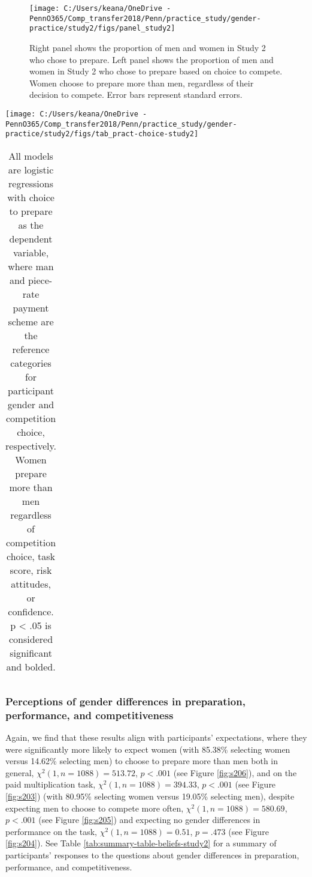 \documentclass[letterpaper, nobind]{templates/ociamthesis}
\begin{document}
\begin{figure}

{\centering \texttt{[image: C:/Users/keana/OneDrive - PennO365/Comp\_transfer2018/Penn/practice\_study/gender-practice/study2/figs/panel\_study2]} 

}

\caption{Right panel shows the proportion of men and women in Study 2 who chose to prepare. Left panel shows the proportion of men and women in Study 2 who chose to prepare based on choice to compete. Women choose to prepare more than men, regardless of their decision to compete. Error bars represent standard errors.}\label{fig:panel-study2}
\end{figure}
\newpage

\begin{center}\texttt{[image: C:/Users/keana/OneDrive - PennO365/Comp\_transfer2018/Penn/practice\_study/gender-practice/study2/figs/tab\_pract-choice-study2]} \end{center}

\begin{table}[ht]
\centering
\begingroup\fontsize{0.1pt}{0.1pt}\selectfont
\begin{tabular}{r}
   \\ 
 \end{tabular}
\endgroup
\caption{All models are logistic regressions with choice to prepare as the dependent variable, where man and piece-rate payment scheme are the reference categories for participant gender and competition choice, respectively. Women prepare more than men regardless of competition choice, task score, risk attitudes, or confidence. p < .05 is considered significant and bolded.} 
\label{tab:tab-pract-choice-study2}
\end{table}

\hypertarget{perceptions-of-gender-differences-in-preparation-performance-and-competitiveness-2}{%
\subsubsection{Perceptions of gender differences in preparation, performance, and competitiveness}\label{perceptions-of-gender-differences-in-preparation-performance-and-competitiveness-2}}

Again, we find that these results align with participants' expectations, where they were significantly more likely to expect women (with 85.38\% selecting women versus 14.62\% selecting men) to choose to prepare more than men both in general, \(\chi^2(1, n = 1088) = 513.72\), \(p < .001\) (see Figure \ref{fig:s206}), and on the paid multiplication task, \(\chi^2(1, n = 1088) = 394.33\), \(p < .001\) (see Figure \ref{fig:s203}) (with 80.95\% selecting women versus 19.05\% selecting men), despite expecting men to choose to compete more often, \(\chi^2(1, n = 1088) = 580.69\), \(p < .001\) (see Figure \ref{fig:s205}) and expecting no gender differences in performance on the task, \(\chi^2(1, n = 1088) = 0.51\), \(p = .473\) (see Figure \ref{fig:s204}). See Table \ref{tab:summary-table-beliefs-study2} for a summary of participants' responses to the questions about gender differences in preparation, performance, and competitiveness.
\end{document}
